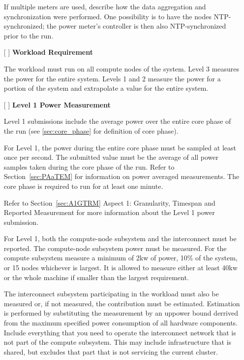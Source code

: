 \begin{itemize}
If multiple meters are used, describe how the data aggregation and synchronization were performed. One possibility is to have the nodes NTP-synchronized; the power meter's controller is then also NTP-synchronized prior to the run.

\item[{[ ]}]
\textbf{Workload Requirement}

The workload must run on all compute nodes of the system. Level 3 measures the power for the entire system. Levels 1 and 2 measure the power for a portion of the system and extrapolate a value for the entire system. 

\item[{[ ]}]
\textbf{Level 1 Power Measurement}

Level 1 submissions include the average power over the entire core phase of the run (see \ref{sec:core_phase} for definition of core phase).

For Level 1, the power during the entire core phase must be sampled at least once per second.
The submitted value must be the average of all power samples taken during the core phase of the run.
Refer to Section~\ref{sec:PAaTEM} for information on power averaged measurements.
The core phase is required to run for at least one minute.

Refer to Section~\ref{sec:A1GTRM} Aspect 1: Granularity, Timespan and Reported Measurement for more information about the Level 1 power submission.

For Level 1, both the compute-node subsystem and the interconnect must be reported.  
The compute-node subsystem power must be measured. 
For the compute subsystem measure a minimum of 2kw of power, 
10\% of the system, or 15 nodes whichever is largest.
It is allowed to measure either at least 40kw or the whole machine if smaller than the largest requirement.

The interconnect subsystem participating in the workload must also be measured or, if not measured, the contribution must be estimated.
Estimation is performed by substituting the measurement by an uppower bound derrived from the maximum specified power consumption of all hardware components.
Include everything that you need to operate the interconnect network that is not part of the compute subsystem. 
This may include infrastructure that is shared, but excludes that part that is not servicing the current cluster.


\end{itemize}
